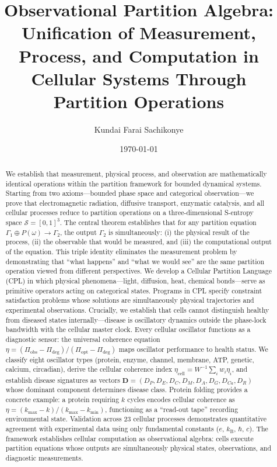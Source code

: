 \documentclass[aps,prd,twocolumn,superscriptaddress,floatfix,nofootinbib]{revtex4-2}
\theoremstyle{remark}
\newcommand{\Sspace}{\mathcal{S}}
\newcommand{\Pop}{P}
\newcommand{\Gstate}{\Gamma}
\newcommand{\kB}{k_{\mathrm{B}}}
\begin{document}
\title{Observational Partition Algebra: Unification of Measurement, Process, and Computation in Cellular Systems Through Partition Operations}

\author{Kundai Farai Sachikonye}

\date{\today}

\begin{abstract}
We establish that measurement, physical process, and observation are mathematically identical operations within the partition framework for bounded dynamical systems. Starting from two axioms---bounded phase space and categorical observation---we prove that electromagnetic radiation, diffusive transport, enzymatic catalysis, and all cellular processes reduce to partition operations on a three-dimensional S-entropy space $\Sspace = [0,1]^3$. The central theorem establishes that for any partition equation $\Gstate_1 \oplus \Pop(\omega) \to \Gstate_2$, the output $\Gstate_2$ is simultaneously: (i) the physical result of the process, (ii) the observable that would be measured, and (iii) the computational output of the equation. This triple identity eliminates the measurement problem by demonstrating that ``what happens'' and ``what we would see'' are the same partition operation viewed from different perspectives. We develop a Cellular Partition Language (CPL) in which physical phenomena---light, diffusion, heat, chemical bonds---serve as primitive operators acting on categorical states. Programs in CPL specify constraint satisfaction problems whose solutions are simultaneously physical trajectories and experimental observations. Crucially, we establish that cells cannot distinguish healthy from diseased states internally---disease is oscillatory dynamics outside the phase-lock bandwidth with the cellular master clock. Every cellular oscillator functions as a diagnostic sensor: the universal coherence equation $\eta = (\Pi_{\mathrm{obs}} - \Pi_{\mathrm{deg}})/(\Pi_{\mathrm{opt}} - \Pi_{\mathrm{deg}})$ maps oscillator performance to health status. We classify eight oscillator types (protein, enzyme, channel, membrane, ATP, genetic, calcium, circadian), derive the cellular coherence index $\eta_{\mathrm{cell}} = W^{-1}\sum_i w_i\eta_i$, and establish disease signatures as vectors $\mathbf{D} = (D_P, D_E, D_C, D_M, D_A, D_G, D_{Ca}, D_R)$ whose dominant component determines disease class. Protein folding provides a concrete example: a protein requiring $k$ cycles encodes cellular coherence as $\eta = (k_{\max} - k)/(k_{\max} - k_{\min})$, functioning as a ``read-out tape'' recording environmental state. Validation across 23 cellular processes demonstrates quantitative agreement with experimental data using only fundamental constants ($e$, $\kB$, $\hbar$, $c$). The framework establishes cellular computation as observational algebra: cells execute partition equations whose outputs are simultaneously physical states, observations, and diagnostic measurements.
\end{abstract}
\end{document}
